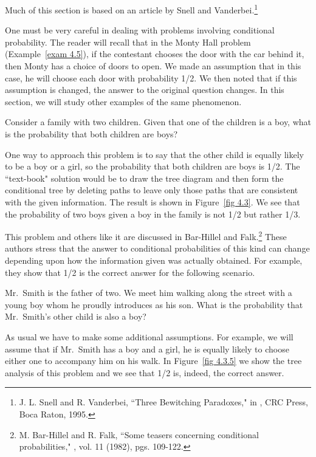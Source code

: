 Much of this section is based on an article by Snell and Vanderbei.\footnote{J. L. Snell and R. Vanderbei, ``Three Bewitching
Paradoxes," in , CRC Press, Boca
Raton, 1995.}
\par
One must be very careful in dealing with problems involving conditional probability.  
The reader will recall that in the Monty Hall problem (Example~\ref{exam 4.5}), if the contestant
chooses the door with the car behind it, then Monty has a choice of doors to open.  We made an
assumption that in this case, he will choose each door with probability 1/2.  We then noted 
that if this assumption is changed, the answer to the original question changes.   In this
section, we will study other examples of the same phenomenon.

\begin{example}\label{exam 4.3.1}
Consider a family with two children.  Given that one of the children is a boy,
what is the probability that both children are boys?
\par
One way to approach this problem is to say that the other child is equally likely to
be a boy or a girl, so the probability that both children are boys is 1/2.  The ``text-book"
solution would be to draw the tree diagram and then form the
conditional tree by deleting paths to leave only those paths that are consistent
with the given information.  The result is shown in Figure~\ref{fig 4.3}. We see that the 
probability of two boys given a boy in the family is not 1/2 but rather 1/3.
\end{example}

This problem and others like it are discussed in Bar-Hillel and
Falk.\footnote{M. Bar-Hillel and R. Falk, ``Some teasers
concerning conditional probabilities," , vol. 11 (1982), pgs. 109-122.} These
authors stress that the answer to conditional probabilities of this  kind can change depending
upon how the information given was actually obtained.   For example, they show that 1/2 is the
correct answer for the following scenario.

\begin{example}\label{exam 4.3.2}
Mr.\ Smith is the father of two.  We meet him walking along the street with a young boy whom 
he proudly introduces as his son.  What is the probability that Mr.\ Smith's other child is also
a boy?
\par
As usual we have to make some additional assumptions.  For example, we will
assume that if Mr.\ Smith has a boy and a girl, he is equally likely to choose
either one to accompany him on his walk. In Figure~\ref{fig 4.3.5} we show the tree analysis of this 
problem and we see that 1/2 is, indeed, the correct answer.
\end{example}

